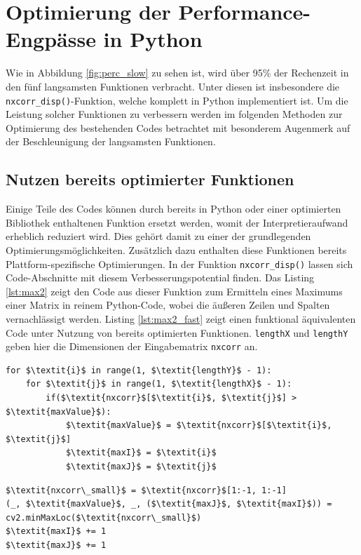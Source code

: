 \section{Optimierung der Performance-Engpässe in Python}

Wie in Abbildung \ref{fig:perc_slow} zu sehen ist, wird über 95\% der Rechenzeit in den fünf langsamsten Funktionen verbracht. Unter diesen ist insbesondere die \texttt{nxcorr\_disp()}-Funktion, welche komplett in Python implementiert ist. Um die Leistung solcher Funktionen zu verbessern werden im folgenden Methoden zur Optimierung des bestehenden Codes betrachtet mit besonderem Augenmerk auf der Beschleunigung der langsamsten Funktionen. 

\subsection{Nutzen bereits optimierter Funktionen}

Einige Teile des Codes können durch bereits in Python oder einer optimierten Bibliothek enthaltenen Funktion ersetzt werden, womit der Interpretieraufwand erheblich reduziert wird. Dies gehört damit zu einer der grundlegenden Optimierungsmöglichkeiten. Zusätzlich dazu enthalten diese Funktionen bereits Plattform-spezifische Optimierungen. In der Funktion \texttt{nxcorr\_disp()} lassen sich Code-Abschnitte mit diesem Verbesserungspotential finden. Das Listing \ref{lst:max2} zeigt den Code aus dieser Funktion zum Ermitteln eines Maximums einer Matrix in reinem Python-Code, wobei die äußeren Zeilen und Spalten vernachlässigt werden. Listing \ref{lst:max2_fast} zeigt einen funktional äquivalenten Code unter Nutzung von bereits optimierten Funktionen. \texttt{lengthX} und \texttt{lengthY} geben hier die Dimensionen der Eingabematrix \texttt{nxcorr} an. 

\begin{lstlisting}[caption={Finden des Maximums einer Matrix}, label={lst:max2}]
for $\textit{i}$ in range(1, $\textit{lengthY}$ - 1):
	for $\textit{j}$ in range(1, $\textit{lengthX}$ - 1):
		if($\textit{nxcorr}$[$\textit{i}$, $\textit{j}$] > $\textit{maxValue}$):
			$\textit{maxValue}$ = $\textit{nxcorr}$[$\textit{i}$, $\textit{j}$]
			$\textit{maxI}$ = $\textit{i}$
			$\textit{maxJ}$ = $\textit{j}$
\end{lstlisting}

\begin{lstlisting}[caption={Finden des Maximums einer Matrix mittels NumPy und OpenCV}, label={lst:max2_fast}]
$\textit{nxcorr\_small}$ = $\textit{nxcorr}$[1:-1, 1:-1]
(_, $\textit{maxValue}$, _, ($\textit{maxJ}$, $\textit{maxI}$)) = cv2.minMaxLoc($\textit{nxcorr\_small}$)
$\textit{maxI}$ += 1
$\textit{maxJ}$ += 1
\end{lstlisting}

